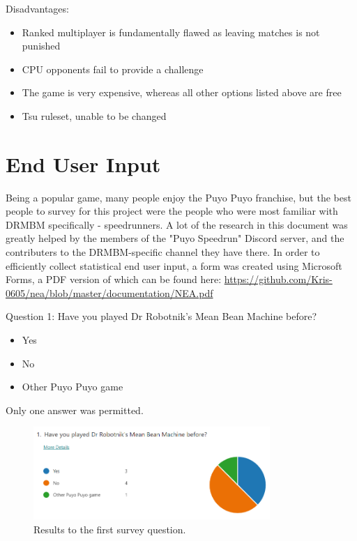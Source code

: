 \documentclass{report}
\begin{document}
Disadvantages: 

\begin{itemize}
    \renewcommand\labelitemi{--}
    \item Ranked multiplayer is fundamentally flawed as leaving matches is not punished
    \item CPU opponents fail to provide a challenge
    \item The game is very expensive, whereas all other options listed above are free
    \item Tsu ruleset, unable to be changed
\end{itemize}

\section{End User Input}

Being a popular game, many people enjoy the Puyo Puyo franchise, but the best people to survey for this project were the people who were most familiar with DRMBM specifically - speedrunners. A lot of the research in this document was greatly helped by the members of the "Puyo Speedrun" Discord server, and the contributers to the DRMBM-specific channel they have there.
In order to efficiently collect statistical end user input, a form was created using Microsoft Forms, a PDF version of which can be found here: \href{https://github.com/Kris-0605/nea/blob/master/documentation/NEA.pdf}{https://github.com/Kris-0605/nea/blob/master/documentation/NEA.pdf}

Question 1: Have you played Dr Robotnik's Mean Bean Machine before?
\begin{itemize}
    \renewcommand\labelitemi{--}
    \item Yes
    \item No
    \item Other Puyo Puyo game
\end{itemize}
Only one answer was permitted.

\begin{figure}[ht]
    \centering
    \includegraphics[width=0.8\textwidth]{survey1.png}
    \caption{\label{fig:survey1}Results to the first survey question.}
\end{figure}
\end{document}
